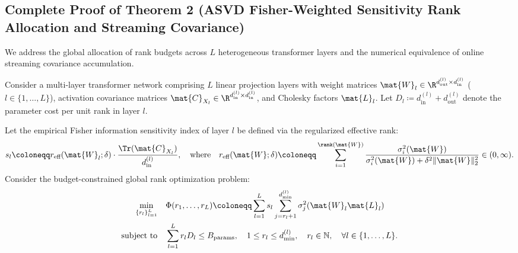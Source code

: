 \subsection{Complete Proof of Theorem 2 (ASVD Fisher-Weighted Sensitivity Rank Allocation and Streaming Covariance)}
\label{sec:appendix_a3_thm2}

We address the global allocation of rank budgets across $L$ heterogeneous transformer layers and the numerical equivalence of online streaming covariance accumulation.

\begin{theorem}
\label{thm:asvd_allocation}
Consider a multi-layer transformer network comprising $L$ linear projection layers with weight matrices $\mat{W}_l \in \R^{d_{\text{out}}^{(l)} \times d_{\text{in}}^{(l)}}$ ($l \in \{1, \dots, L\}$), activation covariance matrices $\mat{C}_{X_l} \in \R^{d_{\text{in}}^{(l)} \times d_{\text{in}}^{(l)}}$, and Cholesky factors $\mat{L}_l$. Let $D_l \coloneqq d_{\text{in}}^{(l)} + d_{\text{out}}^{(l)}$ denote the parameter cost per unit rank in layer $l$.

Let the empirical Fisher information sensitivity index of layer $l$ be defined via the regularized effective rank:
\begin{equation}
s_l \coloneqq r_{\text{eff}}(\mat{W}_l; \delta) \cdot \frac{\Tr(\mat{C}_{X_l})}{d_{\text{in}}^{(l)}}, \quad \text{where} \quad r_{\text{eff}}(\mat{W}; \delta) \coloneqq \sum_{i=1}^{\rank(\mat{W})} \frac{\sigma_i^2(\mat{W})}{\sigma_i^2(\mat{W}) + \delta^2 \|\mat{W}\|_2^2} \in (0, \infty).
\label{eq:layer_sensitivity_def}
\end{equation}
Consider the budget-constrained global rank optimization problem:
\begin{align}
\min_{\{r_l\}_{l=1}^L} \quad & \Phi(r_1, \dots, r_L) \coloneqq \sum_{l=1}^L s_l \sum_{j=r_l+1}^{d_{\min}^{(l)}} \sigma_j^2(\mat{W}_l \mat{L}_l) \label{eq:asvd_primal_obj} \\
\text{subject to} \quad & \sum_{l=1}^L r_l D_l \le B_{\text{params}}, \quad 1 \le r_l \le d_{\min}^{(l)}, \quad r_l \in \mathbb{N}, \quad \forall l \in \{1, \dots, L\}. \label{eq:asvd_primal_constraint}
\end{align}


\end{theorem}
